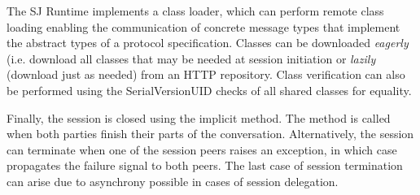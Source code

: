 The SJ Runtime implements a class loader, which can perform remote class loading enabling the communication of concrete message types that implement the abstract types of a protocol specification. Classes can be downloaded \textit{eagerly} (i.e. download all classes that may be needed at session initiation or \textit{lazily} (download just as needed) from an HTTP repository. Class verification can also be performed using the SerialVersionUID checks of all shared classes for equality.

Finally, the session is closed using the implicit  method. The method is called when both parties finish their parts of the conversation. Alternatively, the session can terminate when one of the session peers raises an exception, in which case  propagates the failure signal to both peers. The last case of session termination can arise due to asynchrony possible in cases of session delegation.


	

	


